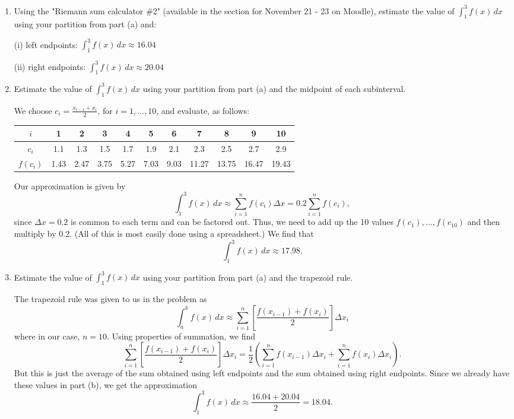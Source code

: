 \documentclass[letterpaper,12pt]{article}
\begin{document}
\begin{enumerate}
\begin{enumerate}
\medskip

\item Using the "Riemann sum calculator \#2" (available in the section for November 21 - 23 on Moodle), estimate the value of $\int_1^3 f(x)\,dx$ using your partition from part (a) and: 

(i) left endpoints: $\int_1^3 f(x) \,dx \approx 16.04$

(ii) right endpoints: $\int_1^3 f(x)\,dx \approx 20.04$

\bigskip

\item Estimate the value of $\int_1^3f(x)\,dx$ using your partition from part (a) and the midpoint of each subinterval.

\medskip

We choose $c_i = \frac{x_{i-1}+x_i}{2}$, for $i=1,\ldots, 10$, and evaluate, as follows:

\begin{center}
\begin{tabular}{c|cccccccccc}
$i$ & 1 &2&3&4&5&6&7&8&9&10\\
\hline
$c_i$&1.1&1.3&1.5&1.7&1.9&2.1&2.3&2.5&2.7&2.9\\
$f(c_i)$&1.43&2.47&3.75&5.27&7.03&9.03&11.27&13.75&16.47&19.43
\end{tabular}
\end{center}


Our approximation is given by
\[
\int_1^3f(x)\,dx \approx \sum_{i=1}^n f(c_i)\Delta x = 0.2\sum_{i=1}^nf(c_i),
\]
since $\Delta x =0.2$ is common to each term and can be factored out. Thus, we need to add up the 10 values $f(c_1),\ldots, f(c_{10})$ and then multiply by 0.2. (All of this is most easily done using a spreadsheet.) We find that
\[
\int_1^3f(x)\,dx \approx 17.98.
\]

\medskip

\item Estimate the value of $\int_1^3f(x)\,dx$ using your partition from part (a) and the trapezoid rule.

\medskip

The trapezoid rule was given to us in the problem as
\[
\int_a^b f(x)\,dx \approx \sum_{i=1}^n \left[\frac{f(x_{i-1})+f(x_i)}{2}\right]\Delta x_i
\]
where in our case, $n=10$. Using properties of summation, we find
\[
\sum_{i=1}^n \left[\frac{f(x_{i-1})+f(x_i)}{2}\right]\Delta x_i = \frac{1}{2}\left(\sum_{i=1}^n f(x_{i-1})\Delta x_i + \sum_{i=1}^nf(x_i)\Delta x_i\right).
\]
But this is just the average of the sum obtained using left endpoints and the sum obtained using right endpoints. Since we already have these values in part (b), we get the approximation
\[
\int_1^3f(x)\,dx \approx \frac{16.04+20.04}{2} = 18.04.
\]
\end{enumerate}


\end{enumerate}
\end{document}
